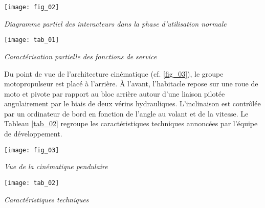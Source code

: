 \begin{multicols}{2}
\begin{center}
\texttt{[image: fig\_02]}

\textit{Diagramme partiel des interacteurs dans la phase d'utilisation normale}
\label{fig_02}
\end{center}

\begin{center}
\texttt{[image: tab\_01]}

\textit{Caractérisation partielle des fonctions de service}
\label{tab_01}
\end{center}

Du point de vue de l'architecture cinématique (cf. \autoref{fig_03}), le groupe motopropulseur est placé à l'arrière. À l'avant, l'habitacle repose sur une roue de moto et pivote par rapport au bloc arrière autour d'une liaison pilotée angulairement par le biais de deux vérins hydrauliques. L'inclinaison est contrôlée par un ordinateur de bord en fonction de l'angle au volant et de la vitesse. Le Tableau \autoref{tab_02} regroupe les caractéristiques techniques annoncées par l'équipe de développement.

\begin{center}
\texttt{[image: fig\_03]}

\textit{Vue de la cinématique pendulaire}
\label{fig_03}
\end{center}

\begin{center}
\texttt{[image: tab\_02]}

\textit{Caractéristiques techniques}
\label{tab_02}
\end{center}


%



\end{multicols}
